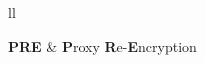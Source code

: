 
\begin{abbreviations}{ll} %
\addchaptertocentry{\abbrevname}

\textbf{PRE} & \textbf{P}roxy \textbf{R}e-\textbf{E}ncryption\\

\end{abbreviations}

